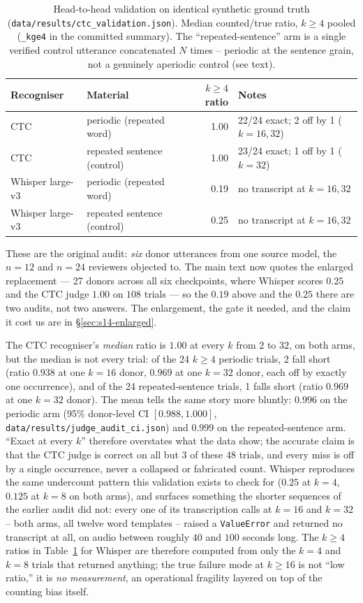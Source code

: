 \documentclass[11pt]{article}
\begin{document}
\begin{table}[h]
\centering
\caption{Head-to-head validation on identical synthetic ground truth
(\texttt{data/results/ctc\_validation.json}). Median counted/true ratio,
$k\ge4$ pooled (\texttt{\_kge4} in the committed summary). The
``repeated-sentence'' arm is a single verified control utterance
concatenated $N$ times -- periodic at the sentence grain, not a genuinely
aperiodic control (see text).}
\label{tab:ctcval}
\small
\begin{tabular}{@{}llrl@{}}
\toprule
Recogniser & Material & $k\ge4$ ratio & Notes \\
\midrule
CTC & periodic (repeated word) & 1.00 & 22/24 exact; 2 off by 1 ($k{=}16,32$) \\
CTC & repeated sentence (control) & 1.00 & 23/24 exact; 1 off by 1 ($k{=}32$) \\
Whisper large-v3 & periodic (repeated word) & 0.19 & no transcript at $k{=}16,32$ \\
Whisper large-v3 & repeated sentence (control) & 0.25 & no transcript at $k{=}16,32$ \\
\bottomrule
\end{tabular}
\end{table}

\noindent These are the original audit: \emph{six} donor utterances from one
source model, the $n{=}12$ and $n{=}24$ reviewers objected to. The main text now
quotes the enlarged replacement --- 27 donors across all six checkpoints, where
Whisper scores $0.25$ and the CTC judge $1.00$ on $108$ trials --- so the
$0.19$ above and the $0.25$ there are two audits, not two answers. The
enlargement, the gate it needed, and the claim it cost us are in
\S\ref{sec:s14-enlarged}.

The CTC recogniser's \emph{median} ratio is $1.00$ at every $k$ from $2$ to
$32$, on both arms, but the median is not every trial: of the 24
$k\ge4$ periodic trials, 2 fall short (ratio $0.938$ at one $k{=}16$ donor,
$0.969$ at one $k{=}32$ donor, each off by exactly one occurrence), and of
the 24 repeated-sentence trials, 1 falls short (ratio $0.969$ at one
$k{=}32$ donor). The mean tells the same story more bluntly: $0.996$ on the
periodic arm (95\% donor-level CI $[0.988, 1.000]$,
\texttt{data/results/judge\_audit\_ci.json}) and $0.999$ on the
repeated-sentence arm. ``Exact at every $k$'' therefore overstates what the
data show; the accurate claim is that the CTC judge is correct on all but 3
of these 48 trials, and every miss is off by a single occurrence, never a
collapsed or fabricated count. Whisper reproduces the same undercount
pattern this validation exists to check for ($0.25$ at $k{=}4$, $0.125$ at
$k{=}8$ on both arms), and surfaces something the shorter sequences of
the earlier audit did not: every one of its transcription calls at $k{=}16$
and $k{=}32$ -- both arms, all twelve word templates -- raised a
\texttt{ValueError} and returned no transcript at all, on audio between
roughly $40$ and $100$ seconds long. The $k\ge4$ ratios in
Table~\ref{tab:ctcval} for Whisper are therefore computed from only the
$k{=}4$ and $k{=}8$ trials that returned anything; the true failure mode at
$k\ge16$ is not ``low ratio,'' it is \emph{no measurement}, an operational
fragility layered on top of the counting bias itself.
\end{document}
